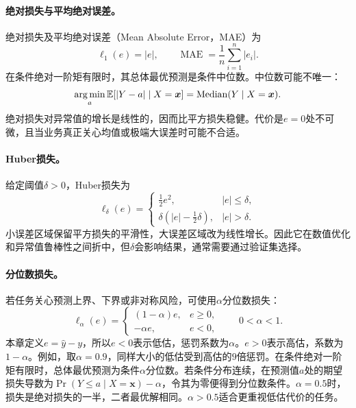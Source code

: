 \paragraph{绝对损失与平均绝对误差。}
绝对损失及平均绝对误差（Mean Absolute Error，MAE）为
\begin{equation}
 \ell_1(e)=|e|,\qquad
 \operatorname{MAE}=\frac1n\sum_{i=1}^n|e_i|.
 \label{eq:regression-mae}
\end{equation}
在条件绝对一阶矩有限时，其总体最优预测是条件中位数。中位数可能不唯一：
\begin{equation}
 \mathop{\mathrm{arg\,min}}_a\mathbb E[|Y-a|\mid X=\bm x]=\operatorname{Median}(Y\mid X=\bm x).
 \label{eq:regression-conditional-median}
\end{equation}
绝对损失对异常值的增长是线性的，因而比平方损失稳健。代价是$e=0$处不可微，且当业务真正关心均值或极端大误差时可能不合适。

\paragraph{Huber损失。}
给定阈值$\delta>0$，Huber损失为
\begin{equation}
 \ell_\delta(e)=
 \begin{cases}
 \frac12e^2,&|e|\leq\delta,\\
 \delta(|e|-\frac12\delta),&|e|>\delta.
 \end{cases}
 \label{eq:regression-huber}
\end{equation}
小误差区域保留平方损失的平滑性，大误差区域改为线性增长。因此它在数值优化和异常值鲁棒性之间折中，但$\delta$会影响结果，通常需要通过验证集选择。

\paragraph{分位数损失。}
若任务关心预测上界、下界或非对称风险，可使用$\alpha$分位数损失：
\begin{equation}
 \ell_\alpha(e)=
 \begin{cases}
 (1-\alpha)e,&e\geq0,\\
 -\alpha e,&e<0,
 \end{cases}
 \qquad 0<\alpha<1.
 \label{eq:regression-quantile}
\end{equation}
本章定义$e=\hat y-y$，所以$e<0$表示低估，惩罚系数为$\alpha$。$e>0$表示高估，系数为$1-\alpha$。例如，取$\alpha=0.9$，同样大小的低估受到高估的$9$倍惩罚。在条件绝对一阶矩有限时，总体最优预测为条件$\alpha$分位数。若条件分布连续，在预测值$a$处的期望损失导数为$\Pr(Y\leq a\mid X=\bm x)-\alpha$，令其为零便得到分位数条件。$\alpha=0.5$时，损失是绝对损失的一半，二者最优解相同。$\alpha>0.5$适合更重视低估代价的任务。

